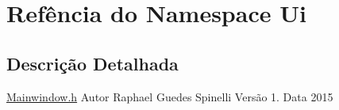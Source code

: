 \hypertarget{namespace_ui}{}\section{Refência do Namespace Ui}
\label{namespace_ui}


\subsection{Descrição Detalhada}
\hyperlink{mainwindow_8h}{Mainwindow.\+h} Autor Raphael Guedes Spinelli Versão 1. Data 2015 
